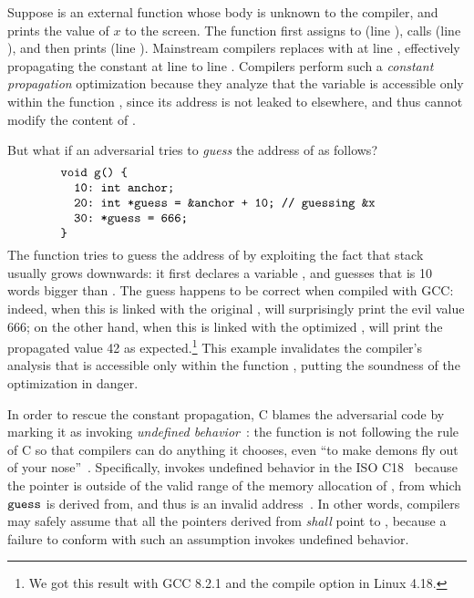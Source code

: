 \noindent Suppose  is an external function whose body is unknown to the compiler, and
 prints the value of $x$ to the screen.  The function  first assigns
 to  (line ), calls  (line ), and then prints 
(line ).  Mainstream compilers replaces  with  at line ,
effectively propagating the constant  at line  to line .  Compilers
perform such a \emph{constant propagation} optimization because they analyze that the variable
 is accessible only within the function , since its address is not leaked to
elsewhere, and thus  cannot modify the content of .

But what if an adversarial  tries to \emph{guess} the address of  as follows?
%
\[
\begin{minipage}{0.8\textwidth}
\begin{verbatim}
void g() {
  10: int anchor;
  20: int *guess = &anchor + 10; // guessing &x
  30: *guess = 666;
}
\end{verbatim}
\end{minipage}
\]
%
\noindent The function  tries to guess the address of  by exploiting the fact that
stack usually grows downwards: it first declares a variable , and guesses that
 is 10 words bigger than .  The guess happens to be correct when compiled
with GCC: indeed, when this  is linked with the original ,  will
surprisingly print the evil value 666; on the other hand, when this  is linked with the
optimized ,  will print the propagated value 42 as expected.\footnote{We got
  this result with GCC 8.2.1 and the compile option  in Linux 4.18.} This
example invalidates the compiler's analysis that  is accessible only within the function
, putting the soundness of the optimization in danger.

In order to rescue the constant propagation, C blames the adversarial code by marking it as invoking
\emph{undefined behavior}~\cite{undefined-behavior}: the function  is not following the
rule of C so that compilers can do anything it chooses, even ``to make demons fly out of your
nose''~\cite{nasal-demons}.  Specifically,  invokes undefined behavior in the ISO
C18~\cite{c18} because the pointer  is outside of the valid range of the memory
allocation of , from which $\texttt{guess}$ is derived from, and thus  is an
invalid address~\cite{c11-6.5.6p8}.  In other words, compilers may safely assume that all the
pointers derived from  \emph{shall} point to , because a failure to
conform with such an assumption invokes undefined behavior.

